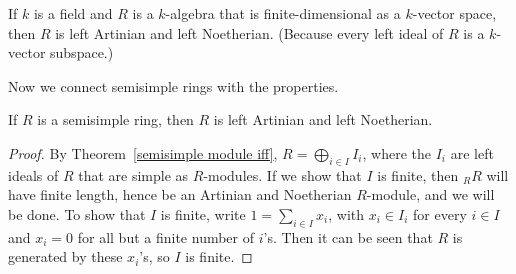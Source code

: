 \begin{example}
If $k$ is a field and $R$ is a $k$-algebra that is finite-dimensional as a $k$-vector space, then $R$ is left Artinian and left Noetherian. (Because every left ideal of $R$ is a $k$-vector subspace.)
\end{example}
Now we connect semisimple rings with the properties.
\begin{proposition}\label{semisimple ring Art Noe}
If $R$ is a semisimple ring, then $R$ is left Artinian and left Noetherian.
\end{proposition}
\begin{proof}
By Theorem~\ref{semisimple module iff}, $R=\bigoplus_{i\in I}I_i$, where the $I_i$ are left ideals of $R$ that are simple as $R$-modules. If we show that $I$ is finite, then $_{R}R$ will have finite length, hence be an Artinian and Noetherian $R$-module, and we will be done. To show
that $I$ is finite, write $1=\sum_{i\in I}x_i$, with $x_i\in I_i$ for every $i\in I$ and $x_i=0$ for all but a finite number of $i$'s. Then it can be seen that $R$ is generated by these $x_i$'s, so $I$ is finite.
\end{proof}

